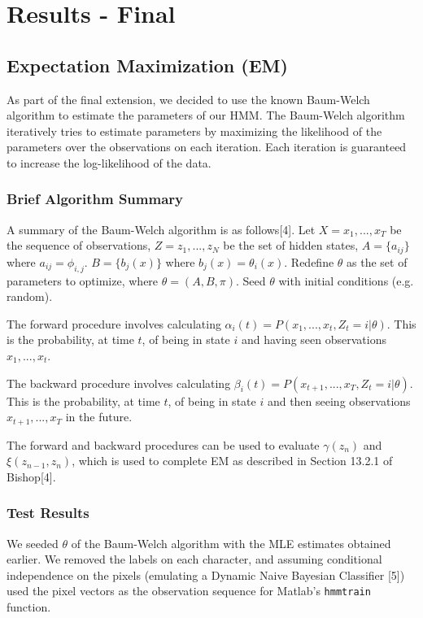 \documentclass{article} %
\begin{document}
\section{Results - Final}

\subsection{Expectation Maximization (EM)}

As part of the final extension, we decided to use the known Baum-Welch algorithm to estimate the parameters of our HMM. The Baum-Welch algorithm iteratively tries to estimate parameters by maximizing the likelihood of the parameters over the observations on each iteration. Each iteration is guaranteed to increase the log-likelihood of the data.

\subsubsection{Brief Algorithm Summary}

A summary of the Baum-Welch algorithm is as follows[4]. Let $X = {x_1, ..., x_T}$ be the sequence of observations, $Z = {z_1, ..., z_N}$ be the set of hidden states, $A = \{ a_{ij} \}$ where $a_{ij} = \phi_{i,j}$. $B = \{ b_j(x) \}$ where $b_j(x) = \theta_i(x)$. Redefine $\theta$ as the set of parameters to optimize, where $\theta = (A, B, \pi)$. Seed $\theta$ with initial conditions (e.g. random).

The forward procedure involves calculating $\alpha_i(t) = P(x_1, ..., x_t, Z_t = i | \theta)$. This is the probability, at time $t$, of being in state $i$ and having seen observations $x_1, ..., x_t$. 

The backward procedure involves calculating $\beta_i(t) = P(x_{t+1}, ...,x_T, Z_t = i | \theta)$. This is the probability, at time $t$, of being in state $i$ and then seeing observations $x_{t+1}, ...,x_T$ in the future. 

The forward and backward procedures can be used to evaluate $\gamma(z_n)$ and $\xi(z_{n-1},z_n)$, which is used to complete EM as described in Section 13.2.1 of Bishop[4].

\subsubsection{Test Results}

We seeded $\theta$ of the Baum-Welch algorithm with the MLE estimates obtained earlier. We removed the labels on each character, and assuming conditional independence on the pixels (emulating a Dynamic Naive Bayesian Classifier [5]) used the pixel vectors as the observation sequence for Matlab's \texttt{hmmtrain} function.
\end{document}
